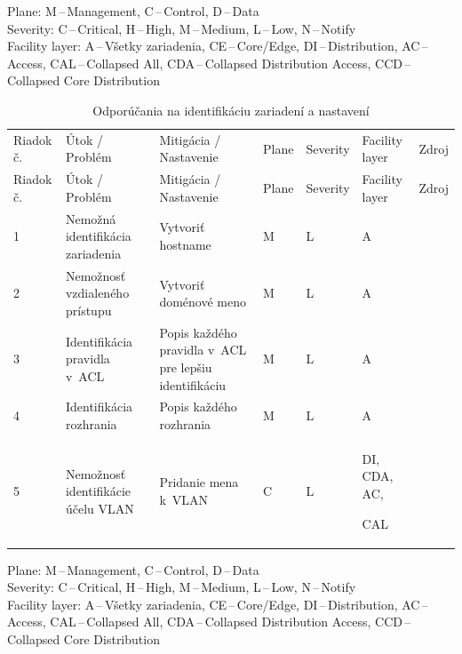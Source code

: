 \vspace{-1em}
{\tiny 
	\noindent
	Plane: M\,--\,Management, C\,--\,Control, D\,--\,Data\\
	Severity: C\,--\,Critical, H\,--\,High, M\,--\,Medium, L\,--\,Low, N\,--\,Notify\\
	Facility layer: A\,--\,Všetky zariadenia, CE\,--\,Core/Edge, DI\,--\,Distribution, AC\,--\,Access, CAL\,--\,Collapsed All, CDA\,--\,Collapsed Distribution Access, CCD\,--\,Collapsed Core Distribution}

\begin{longtable}[!htbp]{|C{2.5em}L{11em}L{11em}C{2.5em}C{4em}C{5em}L{2.5em}|}
	\caption{Odporúčania na identifikáciu zariadení a nastavení}
	\label{tab:identification}\\ \hline
	\mbox{Riadok} č.&Útok / Problém	&Mitigácia / Nastavenie	&Plane	&Severity	&Facility layer	&Zdroj\\ \hhline{=======}
	\endfirsthead 
	\hline
	\centering
	
	Riadok č.	&Útok / Problém	&Mitigácia / Nastavenie	&Plane	&Severity	&Facility layer	&Zdroj\\ \hhline{=======}
	\endhead
	
	 1	&Nemožná identifikácia zariadenia	&Vytvoriť hostname	&M	&L	&A	& \cite{CIS_DrTLsgXv24lxeIIM}\\
	2	&Nemožnosť vzdialeného prístupu	&Vytvoriť doménové meno	&M	&L	&A	& \cite{CIS_DrTLsgXv24lxeIIM}\\
	 3	&Identifikácia pravidla v~ACL	&Popis každého pravidla v~ACL pre lepšiu identifikáciu	&M	&L	&A	& \cite{Singh2018}\\
	4	&Identifikácia rozhrania	&Popis každého rozhrania	&M	&L	&A	& \cite{Lammle2013}\\
	 5	&Nemožnosť identifikácie účelu VLAN	&Pridanie mena k~VLAN	&C	&L	&DI,
	CDA,
	AC,
	
	CAL	& \cite{Lammle2013}\\	
	\hline
\end{longtable}%
\vspace{-1em}
{\tiny 
	\noindent
	Plane: M\,--\,Management, C\,--\,Control, D\,--\,Data\\
	Severity: C\,--\,Critical, H\,--\,High, M\,--\,Medium, L\,--\,Low, N\,--\,Notify\\
	Facility layer: A\,--\,Všetky zariadenia, CE\,--\,Core/Edge, DI\,--\,Distribution, AC\,--\,Access, CAL\,--\,Collapsed All, CDA\,--\,Collapsed Distribution Access, CCD\,--\,Collapsed Core Distribution}


